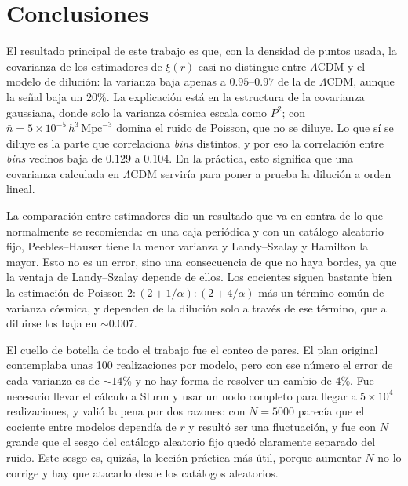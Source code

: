 \documentclass[letterpaper, 12pt]{article}
\newcommand{\LCDM}{\Lambda\mathrm{CDM}}
\begin{document}

    \section{Conclusiones}\label{sec:conclusiones}

        El resultado principal de este trabajo es que, con la densidad de puntos usada, la covarianza de los estimadores de $\xi(r)$ casi no distingue entre $\LCDM$ y el modelo de dilución: la varianza baja apenas a $0.95$--$0.97$ de la de $\LCDM$, aunque la señal baja un 20\%. La explicación está en la estructura de la covarianza gaussiana, donde solo la varianza cósmica escala como $P^2$; con $\bar n = 5\times10^{-5}\,h^3\,\mathrm{Mpc}^{-3}$ domina el ruido de Poisson, que no se diluye. Lo que sí se diluye es la parte que correlaciona \emph{bins} distintos, y por eso la correlación entre \emph{bins} vecinos baja de $0.129$ a $0.104$. En la práctica, esto significa que una covarianza calculada en $\LCDM$ serviría para poner a prueba la dilución a orden lineal.

        La comparación entre estimadores dio un resultado que va en contra de lo que normalmente se recomienda: en una caja periódica y con un catálogo aleatorio fijo, Peebles--Hauser tiene la menor varianza y Landy--Szalay y Hamilton la mayor. Esto no es un error, sino una consecuencia de que no haya bordes, ya que la ventaja de Landy--Szalay depende de ellos. Los cocientes siguen bastante bien la estimación de Poisson $2 : (2 + 1/\alpha) : (2 + 4/\alpha)$ más un término común de varianza cósmica, y dependen de la dilución solo a través de ese término, que al diluirse los baja en ${\sim}0.007$.

        El cuello de botella de todo el trabajo fue el conteo de pares. El plan original contemplaba unas 100 realizaciones por modelo, pero con ese número el error de cada varianza es de ${\sim}14\%$ y no hay forma de resolver un cambio de $4\%$. Fue necesario llevar el cálculo a Slurm y usar un nodo completo para llegar a $5\times10^4$ realizaciones, y valió la pena por dos razones: con $N = 5000$ parecía que el cociente entre modelos dependía de $r$ y resultó ser una fluctuación, y fue con $N$ grande que el sesgo del catálogo aleatorio fijo quedó claramente separado del ruido. Este sesgo es, quizás, la lección práctica más útil, porque aumentar $N$ no lo corrige y hay que atacarlo desde los catálogos aleatorios.
\end{document}
